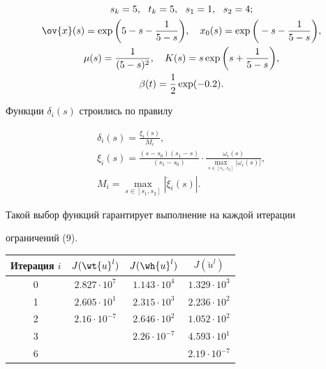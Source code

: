 \begin{gather*}


s_k = 5, \ \  t_k = 5, \ \  s_1 = 1, \ \  s_2 = 4;\\


\ov{x} (s) = \exp \bigg(5 - s - \frac{1}{5-s}\bigg), \quad x_0


(s) = \exp \bigg(- s - \frac{1}{5-s}\bigg),\\


\mu (s) =  \frac{1}{(5-s)^2}, \quad K(s) = s \exp \bigg(s +


\frac{1}{5-s}\bigg),\\


\beta (t) = \frac{1}{2} \exp(-0.2).


\end{gather*}


Функции $\delta_i (s)$ строились по правилу


\begin{gather*}


\delta_i (s) = \frac {\xi_i (s)}{M_i} ,\\


\xi_i (s) = \frac {(s-s_0)(s_1-s)}{(s_1-s_0)} \cdot \frac{\omega_i


(s)}{\max \limits_{s \in [s_1, s_2]} |\omega_i (s)|},\\


M_i = \max\limits_{s\in [s_1, s_2]} |\dot {\xi}_i (s)|.


\end{gather*}


Такой выбор функций гарантирует выполнение на каждой итерации


ограничений (9). 


\medskip





\begin{center}


\begin{tabular}{|c|c|c|c|}


\hline


Итерация $\overset{\phantom{.}}{i}$ & $J(\wt{u}^l)$ & $J(\wh{u}^l)$


& $J(\breve{u}^l)$  \\


\hline


0 & $2.827 \cdot 10^7$  & $1.143 \cdot 10^4$ & $1.329 \cdot 10^3$\\


1 & $2.605 \cdot 10^1$ & $2.315 \cdot 10^3$ & $2.236\cdot 10^2$\\


2 & $2.16 \cdot 10^{-7}$ & $2.646 \cdot 10^2$ & $1.052\cdot 10^2$\\


3 & & $2.26 \cdot 10^{-7}$  & $4.593 \cdot 10^1$ \\


6 & & & $2.19\cdot 10^{-7}$\\


\hline 


\end{tabular}


\end{center}


